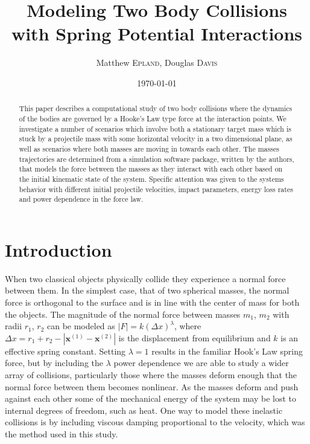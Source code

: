 \documentclass[aps,prl,floatfix,preprint,nofootinbib]{revtex4}
\begin{document}
\title{Modeling Two Body Collisions with Spring Potential Interactions}
\author{Matthew \textsc{Epland}, Douglas \textsc{Davis}}
\date{\today}

\hypersetup{pdftitle=Modeling Two Body Collisions}

\begin{abstract}
  This paper describes a computational study of two body collisions where the dynamics of the bodies are governed by a Hooke's Law type force at the interaction points. We investigate a number of scenarios which involve both a stationary target mass which is stuck by a projectile mass with some horizontal velocity in a two dimensional plane, as well as scenarios where both masses are moving in towards each other. The masses trajectories are determined from a simulation software package, written by the authors, that models the force between the masses as they interact with each other based on the initial kinematic state of the system. Specific attention was given to the systems behavior with different initial projectile velocities, impact parameters, energy loss rates and power dependence in the force law.
\end{abstract}\maketitle
\section{Introduction}
When two classical objects physically collide they experience a normal force between them. In the simplest case, that of two spherical masses, the normal force is orthogonal to the surface and is in line with the center of mass for both the objects. The magnitude of the normal force between masses $m_{1}$, $m_{2}$ with radii $r_{1}$, $r_{2}$ can be modeled as $ \left| F \right| = k \left(\Delta x\right)^{\lambda}$, where $\Delta x = r_1 + r_2 - \left| \mathbf{x}^{(1)}-\mathbf{x}^{(2)} \right|$ is the displacement from equilibrium and $k$ is an effective spring constant. Setting $\lambda = 1$ results in the familiar Hook's Law spring force, but by including the $\lambda$ power dependence we are able to study a wider array of collisions, particularly those where the masses deform enough that the normal force between them becomes nonlinear. As the masses deform and push against each other some of the mechanical energy of the system may be lost to internal degrees of freedom, such as heat. One way to model these inelastic collisions is by including viscous damping proportional to the velocity, which was the method used in this study.
\end{document}
